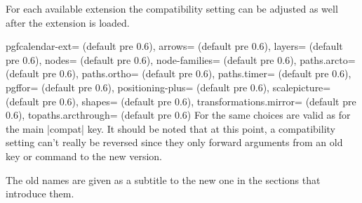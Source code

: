 \begin{multicols}{2}
\newcolumn\noindent
For each available extension the compatibility setting can be adjusted as well
after the extension is loaded.
\begin{keylist}{%
  pgfcalendar-ext= (default pre 0.6),
  arrows= (default pre 0.6),
  layers= (default pre 0.6),
  nodes= (default pre 0.6),
  node-families= (default pre 0.6),
  paths.arcto= (default pre 0.6),
  paths.ortho= (default pre 0.6),
  paths.timer= (default pre 0.6),
  pgffor= (default pre 0.6),
  positioning-plus= (default pre 0.6),
  scalepicture= (default pre 0.6),
  shapes= (default pre 0.6),
  transformations.mirror= (default pre 0.6),
  topaths.arcthrough= (default pre 0.6)%
}
  For  the same choices are valid as for the main |compat| key.
  It should be noted that at this point, a compatibility setting can't really be reversed
  since they only forward arguments from an old key or command to the new version.
  
  The old names are given as a subtitle to the new one in the sections that introduce them.
\end{keylist}
\end{multicols}